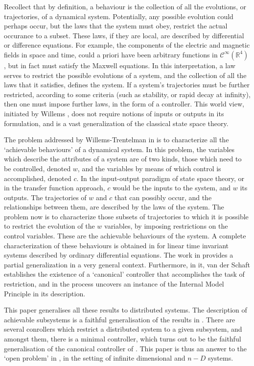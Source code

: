 \documentclass[11pt]{amsart}
\def\Cinf{\mathcal{C}^\infty}
\def\R{\mathbb{R}}
\begin{document}
Recollect that by definition, a behaviour is the collection of all the evolutions, or trajectories, of a dynamical system. Potentially, any possible evolution could perhaps occur,  but the laws that the system must obey, restrict the actual occurance to a subset. These laws, if they are local, are described by differential or difference equations. For example, the components of the electric and magnetic fields in space and time, could a priori have been  arbitrary functions in $\Cinf(\R^4)$, but in fact must satisfy the Maxwell equations. In this interpretation, a law serves to restrict the possible evolutions of a system, and the collection of all the laws that it satisfies, defines the system. If a system's trajectories must be further restricted, according to some criteria (such as stability, or rapid decay at infinity), then one must impose further laws, in the form of a controller. This world view, initiated by Willems \cite{w}, does not require notions of inputs or outputs in its formulation, and is a vast generalization of the classical state space theory.

The problem addressed by Willems-Trentelman in \cite{wt} is to characterize all the `achievable behaviours' of  a dynamical system. In this  problem, the variables which describe the attributes of a system are of two kinds, those which  need to be controlled, denoted $w$, and the variables by means of which control is accomplished, denoted $c$. In the input-output paradigm of state space theory, or in the transfer function approach, $c$ would be the inputs to the system, and $w$ its outputs. The trajectories of $w$ and $c$ that can possibly occur, and the relationships between them, are described by the laws of the system. The problem now is to characterize those  subsets of trajectories to which it is possible to restrict the evolution of the $w$ variables, by imposing restrictions on the control variables. These are the achievable behaviours of the system. A complete characterization of these behaviours is obtained in \cite{wt} for linear time invariant systems described by ordinary differential equations. The work in \cite{sc} provides a partial generalization in a very general context. Furthermore, in it, van der Schaft establishes the existence of a `canonical' controller that accomplishes the task of restriction, 
and in the process  uncovers an instance of the Internal Model Principle in its description. 

This paper generalises all these results to distributed systems. The description of achievable subsystems is a faithful generalisation of the results in \cite{wt}. There are several conrollers which restrict a distributed system to a given subsystem, and amongst them, there is a minimal controller, which turns out to be the faithful generalisation of the canonical controller of \cite{sc}. 
 This paper is thus an answer to the `open problem' in \cite{sc}, in the setting of infinite dimensional and $n-D$ systems.
\end{document}

